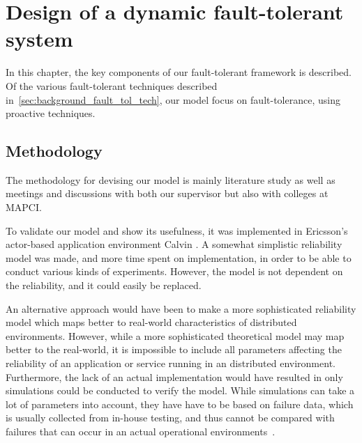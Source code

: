 \documentclass{cslthse-msc}
\begin{document}

\chapter{Design of a dynamic fault-tolerant system} \label{ch:design}
In this chapter, the key components of our fault-tolerant framework is described. Of the various fault-tolerant techniques described in~\ref{sec:background_fault_tol_tech}, our model focus on fault-tolerance, using proactive techniques.

\section{Methodology} \label{sec:design_methodology}
The methodology for devising our model is mainly literature study as well as meetings and discussions with both our supervisor but also with colleges at MAPCI.

To validate our model and show its usefulness, it was implemented in Ericsson's actor-based application environment Calvin \cite{calvin}. A somewhat simplistic reliability model was made, and more time spent on implementation, in order to be able to conduct various kinds of experiments. However, the model is not dependent on the reliability, and it could easily be replaced.

An alternative approach would have been to make a more sophisticated reliability model which maps better to real-world characteristics of distributed environments. However, while a more sophisticated theoretical model may map better to the real-world, it is impossible to include all parameters affecting the reliability of an application or service running in an distributed environment. Furthermore, the lack of an actual implementation would have resulted in only simulations could be conducted to verify the model. While simulations can take a lot of parameters into account, they have have to be based on failure data, which is usually collected from in-house testing, and thus cannot be compared with failures that can occur in an actual operational environments~\cite{surveyReliabilityDistr}.
\end{document}
